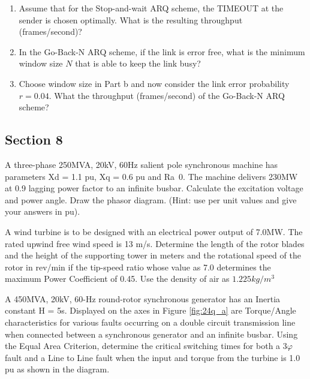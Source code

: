 \documentclass[main.tex]{subfiles}
\begin{document}
\begin{enumerate}
{    \begin{enumerate}
        \item Assume that for the Stop-and-wait ARQ scheme, the TIMEOUT at the sender is chosen optimally. What is the resulting throughput (frames/second)?
        \item  In the Go-Back-N ARQ scheme, if the link is error free, what is the minimum window size $N$ that is able to keep the link busy?
        \item Choose window size in Part b and now consider the link error probability $r=0.04$. What the throughput (frames/second) of the Go-Back-N ARQ scheme?
    \end{enumerate}

\subsection{Section 8}

\item A three-phase 250MVA, 20kV, 60Hz salient pole synchronous machine has parameters Xd = 1.1 pu, Xq = 0.6 pu and Ra~0. The machine delivers 230MW at 0.9 lagging power factor to an infinite busbar. Calculate the excitation voltage and power angle. Draw the phasor diagram. (Hint: use per unit values and give your answers in pu).

\item A wind turbine is to be designed with an electrical power output of 7.0MW. The rated upwind free wind speed is 13 m/s. Determine the length of the rotor blades and the height of the supporting tower in meters and the rotational speed of the rotor in rev/min if the tip-speed ratio whose value as 7.0 determines the maximum Power Coefficient of 0.45. Use the density of air as $\num{1.225}\unit{kg/m^3}$

\item A 450MVA, 20kV, 60-Hz round-rotor synchronous generator has an Inertia constant H = 5s. Displayed on the axes in Figure \ref{fig:24q_a} are Torque/Angle characteristics for various faults occurring on a double circuit transmission line when connected between a synchronous generator and an infinite busbar. Using the Equal Area Criterion, determine the critical switching times for both a $3 \varphi$ fault and a Line to Line fault when the input and torque from the turbine is 1.0 pu as shown in the diagram.

}
\end{enumerate}
\end{document}
